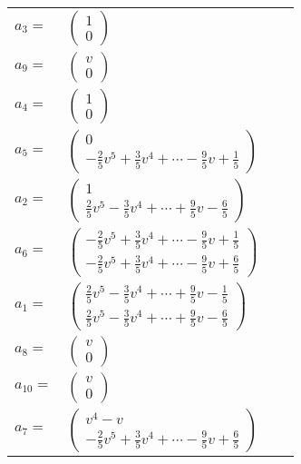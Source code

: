 \documentclass[1p]{elsarticle_modified}
\theoremstyle{definition}
\begin{document}
\begin{tabular}{m{7pt} m{180pt} m{7pt} m{180pt} }
\flushright $a_{3}=$&$\begin{pmatrix}1\\0\end{pmatrix}$ \\
\flushright $a_{9}=$&$\begin{pmatrix}v\\0\end{pmatrix}$ \\
\flushright $a_{4}=$&$\begin{pmatrix}1\\0\end{pmatrix}$ \\
\flushright $a_{5}=$&$\begin{pmatrix}0\\-\frac{2}{5} v^5+\frac{3}{5} v^4+\cdots-\frac{9}{5} v+\frac{1}{5}\end{pmatrix}$ \\
\flushright $a_{2}=$&$\begin{pmatrix}1\\\frac{2}{5} v^5-\frac{3}{5} v^4+\cdots+\frac{9}{5} v-\frac{6}{5}\end{pmatrix}$ \\
\flushright $a_{6}=$&$\begin{pmatrix}-\frac{2}{5} v^5+\frac{3}{5} v^4+\cdots-\frac{9}{5} v+\frac{1}{5}\\-\frac{2}{5} v^5+\frac{3}{5} v^4+\cdots-\frac{9}{5} v+\frac{6}{5}\end{pmatrix}$ \\
\flushright $a_{1}=$&$\begin{pmatrix}\frac{2}{5} v^5-\frac{3}{5} v^4+\cdots+\frac{9}{5} v-\frac{1}{5}\\\frac{2}{5} v^5-\frac{3}{5} v^4+\cdots+\frac{9}{5} v-\frac{6}{5}\end{pmatrix}$ \\
\flushright $a_{8}=$&$\begin{pmatrix}v\\0\end{pmatrix}$ \\
\flushright $a_{10}=$&$\begin{pmatrix}v\\0\end{pmatrix}$ \\
\flushright $a_{7}=$&$\begin{pmatrix}v^4- v\\-\frac{2}{5} v^5+\frac{3}{5} v^4+\cdots-\frac{9}{5} v+\frac{6}{5}\end{pmatrix}$ \\

\end{tabular}
\end{document}
